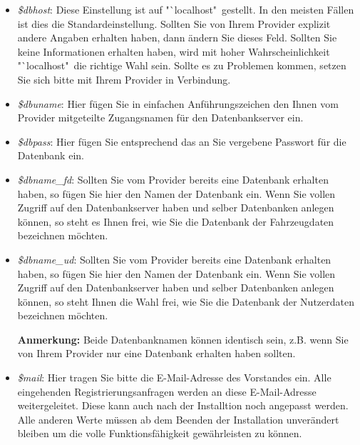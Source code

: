 \documentclass[fontsize = 12pt, paper = a4]{scrreprt}
\begin{document}
\begin{itemize}[leftmargin=*]

\item \textit{\$dbhost}: Diese Einstellung ist auf "`localhost"\ gestellt. In den meisten Fällen ist dies die Standardeinstellung. Sollten Sie von Ihrem Provider explizit andere Angaben erhalten haben, dann ändern Sie dieses Feld. Sollten Sie keine Informationen erhalten haben, wird mit hoher Wahrscheinlichkeit "`localhost"\ die richtige Wahl sein. Sollte es zu Problemen kommen, setzen Sie sich bitte mit Ihrem Provider in Verbindung.


\item \textit{\$dbuname}: Hier fügen Sie in einfachen Anführungszeichen den Ihnen vom Provider mitgeteilte Zugangsnamen für den Datenbankserver ein.


\item \textit{\$dbpass}: Hier fügen Sie entsprechend das an Sie vergebene Passwort für die Datenbank ein.

\item \textit{\$dbname\_fd}: Sollten Sie vom Provider bereits eine Datenbank erhalten haben, so fügen Sie hier den Namen der Datenbank ein. Wenn Sie vollen Zugriff auf den Datenbankserver haben und selber Datenbanken anlegen können, so steht es Ihnen frei, wie Sie die Datenbank der Fahrzeugdaten bezeichnen möchten.


\item \textit{\$dbname\_ud}: Sollten Sie vom Provider bereits eine Datenbank erhalten haben, so fügen Sie hier den Namen der Datenbank ein. Wenn Sie vollen Zugriff auf den Datenbankserver haben und selber Datenbanken anlegen können, so steht Ihnen die Wahl frei, wie Sie die Datenbank der Nutzerdaten bezeichnen möchten.

\textbf{Anmerkung:} Beide Datenbanknamen können identisch sein, z.B. wenn Sie von Ihrem Provider nur eine Datenbank erhalten haben sollten. 

\item \textit{\$mail}: Hier tragen Sie bitte die E-Mail-Adresse des Vorstandes ein. Alle eingehenden Registrierungsanfragen werden an diese E-Mail-Adresse weitergeleitet. Diese kann auch nach der Installtion noch angepasst werden. Alle anderen Werte müssen ab dem Beenden der Installation unverändert bleiben um die volle Funktionsfähigkeit gewährleisten zu können.

\end{itemize}

\newpage
\end{document}
